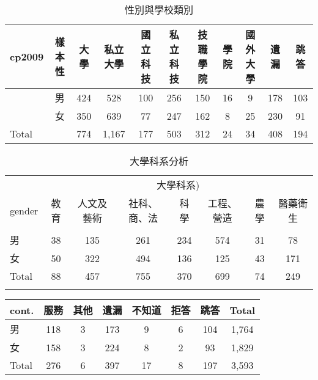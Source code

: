 \documentclass[12pt, a4paper]{article}
\begin{document}
\bigskip

\begin{table}[htbp]
  \centering
  \renewcommand{\arraystretch}{1.3} %
  \caption{性別與學校類別}
  \begin{adjustbox}{width=\textwidth}
    \begin{tabular}{lcccccccccc}
      \toprule
      cp2009 & 樣本性 & 大學 & 私立大學 & 國立科技 & 私立科技 & 技職學院 & 學院 & 國外大學 & 遺漏 & 跳答 \\
      \midrule
      & 男 & 424 & 528 & 100 & 256 & 150 & 16 & 9 & 178 & 103 \\
      & 女 & 350 & 639 & 77 & 247 & 162 & 8 & 25 & 230 & 91 \\
      \midrule
      Total & & 774 & 1,167 & 177 & 503 & 312 & 24 & 34 & 408 & 194 \\
      \bottomrule
    \end{tabular}
    \label{tab:gender_school}
  \end{adjustbox}
\end{table}

\bigskip

\begin{table}[H]
\centering
\extrarowheight=5pt
\caption{大學科系分析 }
\begin{adjustbox}{width=\textwidth}
\begin{tabular}{l*{7}{c}}
\toprule
 & \multicolumn{7}{c}{大學科系)} \\
gender & 教育 & 人文及藝術 & 社科、商、法 & 科學 & 工程、營造 & 農學 & 醫藥衛生 \\
 \\
\midrule
男 & 38 & 135 & 261 & 234 & 574 & 31 & 78 \\
女 & 50 & 322 & 494 & 136 & 125 & 43 & 171 \\
Total & 88 & 457 & 755 & 370 & 699 & 74 & 249 \\
\bottomrule
\label{tab:gender_major}
\end{tabular}
\end{adjustbox}
\end{table}

\begin{table}[H]
\centering
\extrarowheight=3pt
\begin{adjustbox}{width=0.8\textwidth}
\begin{tabular}{l*{7}{c}}
\toprule
cont. & 服務 & 其他 & 遺漏 & 不知道 & 拒答 & 跳答 & Total \\
\midrule
男 & 118 & 3 & 173 & 9 & 6 & 104 & 1,764 \\
女 & 158 & 3 & 224 & 8 & 2 & 93 & 1,829 \\
Total & 276 & 6 & 397 & 17 & 8 & 197 & 3,593 \\
\bottomrule
\end{tabular}
\end{adjustbox}

\end{table}
\end{document}

